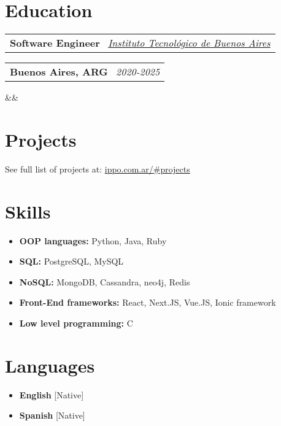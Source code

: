 \documentclass[11pt,a4paper,sans]{moderncv}
\makeatletter
\newcommand*{\customcventry}[7][.13em]{
\begin{tabular}{@{}l}
{\bfseries #4} \
{\itshape #3}
\end{tabular}
\hfill
\begin{tabular}{l@{}}
{\bfseries #5} \
{\itshape #2}
\end{tabular}
\ifx&#7&%
\else{\
\begin{minipage}{\maincolumnwidth}%
\small#7%
\end{minipage}}\fi%
\par\addvspace{#1}}
\makeatother
\begin{document}
\section{Education}
\customcventry{2020-2025}{\color{blue}\href{https://www.itba.edu.ar/}{Instituto Tecnológico de Buenos Aires}}{Software Engineer}{Buenos Aires, ARG}{}{}{Relevant Courses: Full-Stack web development, Operating Systems, Data Bases I \& II, OOP \& Software Engineering
.}


\section{Projects}
See full list of projects at: {\color{blue} \href{https://www.ippo.com.ar/\#projects}{ippo.com.ar/\#projects}}


\section{Skills}
{\begin{itemize}[label=\textbullet]
\item {\textbf{OOP languages:} Python, Java, Ruby}
\item {\textbf{SQL:} PostgreSQL, MySQL}
\item {\textbf{NoSQL:} MongoDB, Cassandra, neo4j, Redis}
\item {\textbf{Front-End frameworks:} React, Next.JS, Vue.JS, Ionic framework}
\item {\textbf{Low level programming:} C}
\end{itemize}}

\section{Languages}
\begin{multicols}{2}
    \begin{itemize}[label=\textbullet]
    \item \textbf{English} [Native]
    \item {\textbf{Spanish} [Native]}

    \end{itemize}
\end{multicols}
\end{document}
